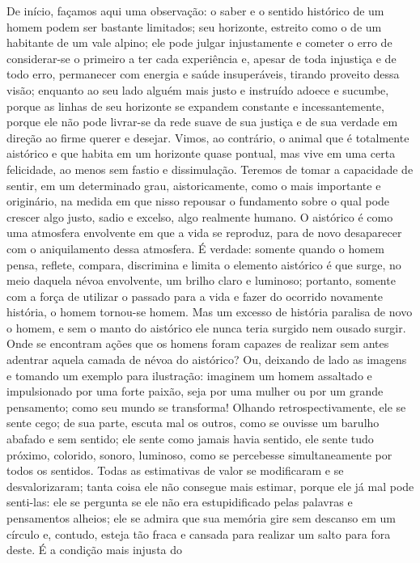 De início, façamos aqui uma observação: o saber e o sentido histórico de
um homem podem ser bastante limitados; seu horizonte, estreito como o de
um habitante de um vale alpino; ele pode julgar injustamente e cometer o
erro de considerar-se o primeiro a ter cada experiência e, apesar de
toda injustiça e de todo erro, permanecer com energia e saúde
insuperáveis, tirando proveito dessa visão; enquanto ao seu lado alguém
mais justo e instruído adoece e sucumbe, porque as linhas de seu
horizonte se expandem constante e incessantemente, porque ele não pode
livrar-se da rede suave de sua justiça e de sua verdade em direção ao
firme querer e desejar. Vimos, ao contrário, o animal que é totalmente
aistórico e que habita em um horizonte quase pontual, mas vive em uma
certa felicidade, ao menos sem fastio e dissimulação. Teremos de tomar a
capacidade de sentir, em um determinado grau, aistoricamente, como o
mais importante e originário, na medida em que nisso repousar o
fundamento sobre o qual pode crescer algo justo, sadio e excelso, algo
realmente humano. O aistórico é como uma atmosfera envolvente em que a
vida se reproduz, para de novo desaparecer com o aniquilamento dessa
atmosfera. É verdade: somente quando o homem pensa, reflete, compara,
discrimina e limita o elemento aistórico é que surge, no meio daquela
névoa envolvente, um brilho claro e luminoso; portanto, somente com a
força de utilizar o passado para a vida e fazer do ocorrido novamente
história, o homem tornou-se homem. Mas um excesso de história paralisa
de novo o homem, e sem o manto do aistórico ele nunca teria surgido nem
ousado surgir. Onde se encontram ações que os homens foram capazes de
realizar sem antes adentrar aquela camada de névoa do aistórico? Ou,
deixando de lado as imagens e tomando um exemplo para ilustração:
imaginem um homem assaltado e impulsionado por uma forte paixão, seja
por uma mulher ou por um grande pensamento; como seu mundo se
transforma! Olhando retrospectivamente, ele se sente cego; de sua parte, 
escuta mal os outros, como se ouvisse um barulho abafado e sem
sentido; ele sente como jamais havia sentido, ele sente tudo próximo,
colorido, sonoro, luminoso, como se percebesse simultaneamente por todos
os sentidos. Todas as estimativas de valor se modificaram e se
desvalorizaram; tanta coisa ele não consegue mais estimar, porque ele já
mal pode senti-las: ele se pergunta se ele não era estupidificado
pelas palavras e pensamentos alheios; ele se admira que sua memória gire
sem descanso em um círculo e, contudo, esteja tão fraca e cansada para
realizar um salto para fora deste. É a condição mais injusta do
